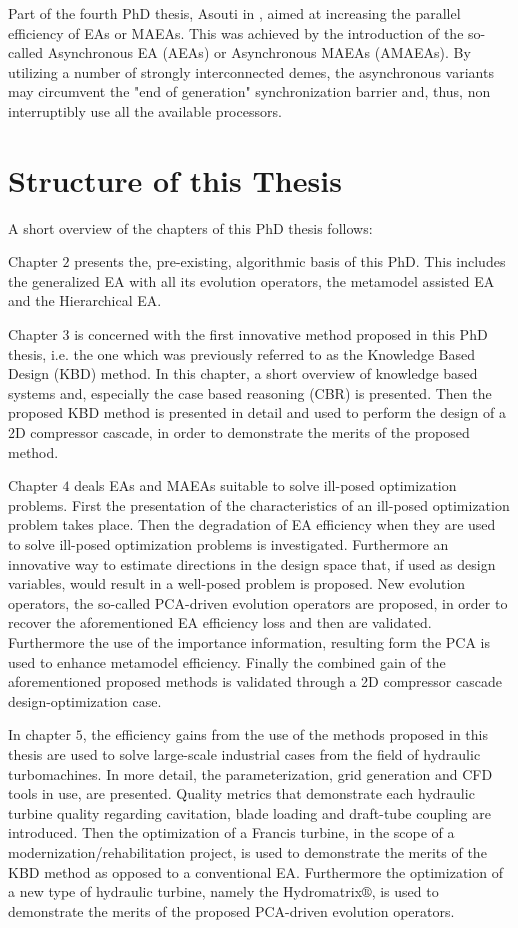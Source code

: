 Part of the fourth PhD thesis, Asouti in \cite{phd_Vera}, aimed at increasing the parallel efficiency of EAs or MAEAs. This was achieved by the introduction of the so-called Asynchronous EA (AEAs) or Asynchronous MAEAs (AMAEAs). By utilizing a number of strongly interconnected demes, the asynchronous variants may circumvent the "end of generation" synchronization barrier and, thus, non interruptibly use all the available processors.    

\section{Structure of this Thesis} %
A short overview of the chapters of this PhD thesis follows:

Chapter $2$ presents the, pre-existing, algorithmic basis of this PhD. This includes the generalized EA with all its evolution operators, the metamodel assisted EA and the Hierarchical EA.

Chapter $3$ is concerned with the first innovative method proposed in this PhD thesis, i.e. the one which was previously referred to as the Knowledge Based Design (KBD) method. In this chapter, a short overview of knowledge based systems and, especially the case based reasoning (CBR) is presented. Then the proposed KBD method is presented in detail and used to perform the design of a 2D compressor cascade, in order to demonstrate the merits of the proposed method.

Chapter $4$ deals EAs and MAEAs suitable to solve ill-posed optimization problems. First the presentation of the characteristics of an ill-posed optimization problem takes place. Then the degradation of EA efficiency when they are used to solve ill-posed optimization problems is investigated. Furthermore an innovative way to estimate directions in the design space that, if used as design variables, would result in a well-posed problem is proposed.  New evolution operators, the so-called PCA-driven evolution operators are proposed, in order to recover the aforementioned EA efficiency loss and then are  validated. Furthermore the use of the importance information, resulting form the PCA is used to enhance metamodel efficiency. Finally the combined gain of the aforementioned proposed methods is validated through a 2D compressor cascade design-optimization case.

In chapter $5$, the efficiency gains from the use of the methods proposed in this thesis are used to solve large-scale industrial cases from the field of hydraulic turbomachines. In more detail, the parameterization, grid generation and CFD tools in use, are presented. Quality metrics that demonstrate each hydraulic turbine quality regarding cavitation, blade loading and draft-tube coupling are introduced. Then the optimization of a Francis turbine, in the scope of a modernization/rehabilitation project, is used to demonstrate the merits of the KBD method as opposed to a conventional EA. Furthermore the optimization of a new type of hydraulic turbine, namely the Hydromatrix$\circledR$, is used to demonstrate the merits of the proposed PCA-driven evolution operators.


